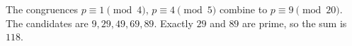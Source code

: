 The congruences $p\equiv1\pmod4$, $p\equiv4\pmod5$ combine to $p\equiv9\pmod{20}$. The candidates are $9,29,49,69,89$. Exactly $29$ and $89$ are prime, so the sum is $\boxed{118}$.
